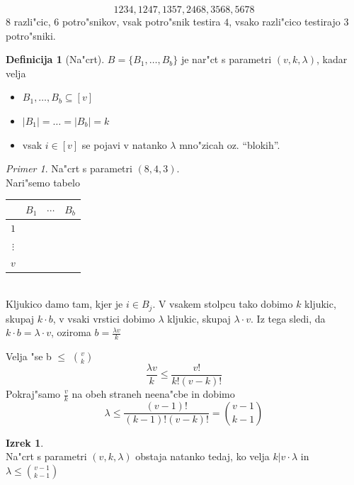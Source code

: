 \documentclass[a4paper,12pt]{article}
\theoremstyle{definition}
\newtheorem{defn}[counter]{Definicija}
\newtheorem{theorem}[counter]{Izrek}
\theoremstyle{remark}
\newtheorem*{ex}{Primer}
\begin{document}
\[1234, 1247, 1357, 2468, 3568, 5678\]
$8$ razli"cic, $6$ potro"snikov, vsak potro"snik testira $4$, vsako razli"cico testirajo $3$ potro"sniki.

\begin{defn}[Na"crt]
	$B = \{B_1, \ldots, B_b\}$ je nar"ct s parametri $(v, k, \lambda)$, kadar velja
	\begin{itemize}
		\item $B_1, \ldots, B_b \subseteq [v]$
		\item $|B_1| = \ldots = |B_b| = k$
		\item vsak $i \in [v]$ se pojavi v natanko $\lambda$ mno"zicah oz. ``blokih''.
	\end{itemize}
\end{defn}

\begin{ex}
	Na"crt s parametri $(8, 4, 3)$.\\
	Nari"semo tabelo
	\begin{tabular}{c|c c c}
		& $B_1$ & $\cdots$ & $B_b$ \\
		\hline
		$1$ \\
		$\vdots$ \\
		$v$
	\end{tabular}\\
	Kljukico damo tam, kjer je $i \in B_j$. V vsakem stolpcu tako dobimo $k$ kljukic, skupaj $k\cdot b$, v vsaki vrstici dobimo $\lambda$ kljukic, skupaj $\lambda \cdot v$. Iz tega sledi, da $k \cdot b = \lambda \cdot v$, oziroma $b = \frac{\lambda v}{k}$

	Velja "se b $\leqslant$ $\binom{v}{k}$
	\[\frac{\lambda v}{k} \leqslant \frac{v!}{k! (v-k)!}\]
	Pokraj"samo $\frac{v}{k}$ na obeh straneh neena"cbe in dobimo
	\[\lambda \leqslant \frac{(v - 1)!}{(k - 1)! (v - k)!} = \binom{v-1}{k-1}\]
\end{ex}

\begin{theorem}\mbox{}\\
	Na"crt s parametri $(v, k, \lambda)$ obstaja natanko tedaj, ko velja $k | v\cdot \lambda$ in $\lambda \leqslant \binom{v - 1}{k - 1}$
\end{theorem}
\end{document}
